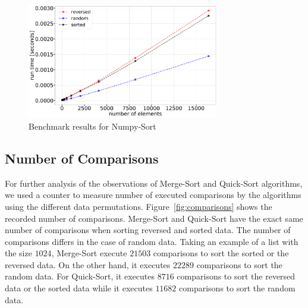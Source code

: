 \documentclass[sigconf, nonacm, natbib, screen, balance=False]{acmart}
\begin{document}
\begin{figure}
  \centering
  \includegraphics[width=84mm]{../figures/np_sort.pdf}
  \caption{Benchmark results for Numpy-Sort}
  \label{fig:np}
\end{figure}

\subsection{Number of Comparisons}\label{sec:nr_comparisons}
For further analysis of the observations of Merge-Sort and Quick-Sort algorithms, we used a counter to measure number of executed comparisons by the algorithms using the different data permutations. Figure~\ref{fig:comparisons} shows the recorded number of comparisons. Merge-Sort and Quick-Sort have the exact same number of comparisons when sorting reversed and sorted data. The number of comparisons differs in the case of random data. Taking an example of a list with the size $1024$, Merge-Sort execute $21503$ comparisons to sort the sorted or the reversed data. On the other hand, it executes $22289$ comparisons to sort the random data. For Quick-Sort, it executes $8716$ comparisons to sort the reversed data or the sorted data while it executes $11682$ comparisons to sort the random data.
\end{document}
